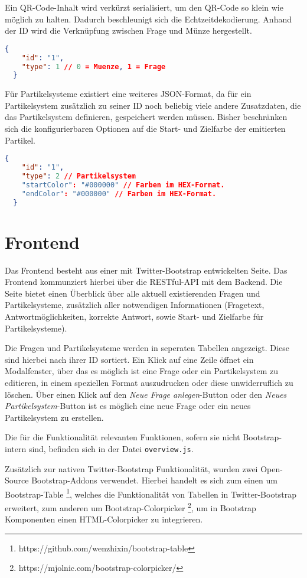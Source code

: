Ein QR-Code-Inhalt wird verkürzt serialisiert, um den QR-Code so klein wie möglich zu halten. Dadurch beschleunigt sich die Echtzeitdekodierung. Anhand der ID wird die Verknüpfung zwischen Frage und Münze hergestellt.
\begin{lstlisting}[language=JSON]
  {
    "id": "1",
    "type": 1 // 0 = Muenze, 1 = Frage
  }
\end{lstlisting}

Für Partikelsysteme existiert eine weiteres JSON-Format, da für ein Partikelsystem zusätzlich zu seiner ID noch beliebig viele andere Zusatzdaten, die das Partikelsystem definieren, gespeichert werden müssen.
Bisher beschränken sich die konfigurierbaren Optionen auf die Start- und Zielfarbe der emitierten Partikel.

\begin{lstlisting}[language=JSON]
  {
    "id": "1",
    "type": 2 // Partikelsystem
    "startColor": "#000000" // Farben im HEX-Format.
    "endColor": "#000000" // Farben im HEX-Format.
  }
\end{lstlisting}

\section{Frontend}
Das Frontend besteht aus einer mit Twitter-Bootstrap entwickelten Seite. Das Frontend kommunziert hierbei über die RESTful-API mit dem Backend. Die Seite bietet einen Überblick über alle aktuell existierenden Fragen und Partikelsysteme, zusätzlich aller notwendigen Informationen (Fragetext, Antwortmöglichkeiten, korrekte Antwort, sowie Start- und Zielfarbe für Partikelsysteme).

Die Fragen und Partikelsysteme werden in seperaten Tabellen angezeigt. Diese sind hierbei nach ihrer ID sortiert. Ein Klick auf eine Zeile öffnet ein Modalfenster, über das es möglich ist eine Frage oder ein Partikelsystem zu editieren, in einem speziellen Format auszudrucken oder diese unwiderruflich zu löschen. Über einen Klick auf den \emph{Neue Frage anlegen}-Button oder den \emph{Neues Partikelsystem}-Button ist es möglich eine neue Frage oder ein neues Partikelsystem zu erstellen.

Die für die Funktionalität relevanten Funktionen, sofern sie nicht Bootstrap-intern sind, befinden sich in der Datei \texttt{overview.js}.

Zusätzlich zur nativen Twitter-Bootstrap Funktionalität, wurden zwei Open-Source Bootstrap-Addons verwendet. Hierbei handelt es sich zum einen um Bootstrap-Table \footnote{https://github.com/wenzhixin/bootstrap-table}, welches die Funktionalität von Tabellen in Twitter-Bootstrap erweitert, zum anderen um Bootstrap-Colorpicker \footnote{https://mjolnic.com/bootstrap-colorpicker/}, um in Bootstrap Komponenten einen HTML-Colorpicker zu integrieren.
